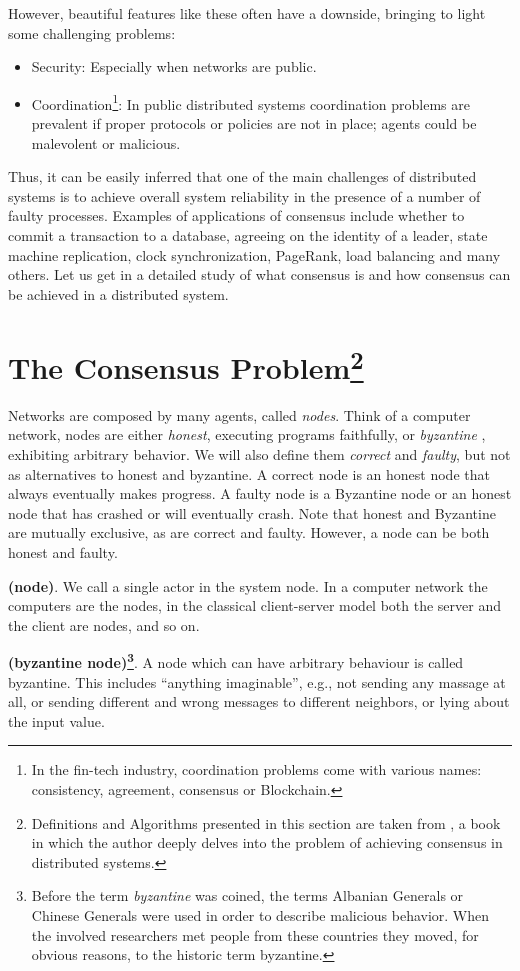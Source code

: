 \bigskip
\noindent
However, beautiful features like these often have a downside, bringing to light some challenging problems:
\begin{itemize}
    \item Security: Especially when networks are public.
    \item Coordination\footnote{In the fin-tech industry, coordination problems come with various names: consistency, agreement, consensus or Blockchain.}: In public distributed systems coordination problems are prevalent if proper protocols or policies are not in place; agents could be malevolent or malicious.
\end{itemize}
Thus, it can be easily inferred that one of the main challenges of distributed systems is to achieve overall system reliability in the presence of a number of faulty processes. Examples of applications of consensus include whether to commit a transaction to a database, agreeing on the identity of a leader, state machine replication, clock synchronization, PageRank, load balancing and many others. Let us get in a detailed study of what consensus is and how consensus can be achieved in a distributed system.

\bigskip
\section[The Consensus Problem]{The Consensus Problem\footnote{Definitions and Algorithms presented in this section are taken from \cite{Wattenhofer:2016:SB:3002702}, a book in which the author deeply delves into the problem of achieving consensus in distributed systems.}} 
Networks are composed by many agents, called \textit{nodes}. Think of a computer network, nodes are either \textit{honest}, executing programs faithfully, or \textit{byzantine} \cite{Lamport:1982:BGP:357172.357176}, exhibiting arbitrary behavior. We will also define them \textit{correct} and \textit{faulty}, but not as alternatives to honest and byzantine. A correct node is an honest node that always eventually makes progress. A faulty node is a Byzantine node or an honest node that has crashed or will eventually crash. Note that honest and Byzantine
are mutually exclusive, as are correct and faulty. However, a node can be both honest and faulty.
\begin{mydef} {\bf (node)}.
    We call a single actor in the system node. In a computer network the computers are the nodes, in the classical client-server model both the server and the client are nodes, and so on.
\end{mydef}
\begin{mydef} {\bf (byzantine node)\footnote{Before the term \textit{byzantine} was coined, the terms Albanian Generals or Chinese Generals were used in order to describe malicious behavior. When the involved researchers met people from these countries they moved, for obvious reasons, to the historic term byzantine.}}.
    \label{def:byzantine-node}
    A node which can have arbitrary behaviour is called byzantine. This includes \enquote{anything imaginable}, e.g., not sending any massage at all, or sending different and wrong messages to different neighbors, or lying about the input value.
\end{mydef}

